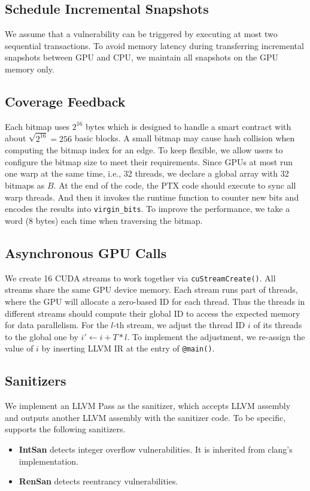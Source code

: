 \subsection{Schedule Incremental Snapshots}
We assume that a vulnerability can be triggered by executing at most two sequential transactions. 
%
To avoid memory latency\cite{bottleneck2015gpu} during transferring incremental snapshots between GPU and CPU, we maintain all snapshots on the GPU memory only. 
%



\subsection{Coverage Feedback}
Each bitmap uses $2^{16}$ bytes which is designed to handle a smart contract with about $\sqrt{2^{16}} = 256$ basic blocks.
A small bitmap may cause hash collision when computing the bitmap index for an edge. 
To keep flexible, we allow users to configure the bitmap size to meet their requirements. 
%
Since GPUs at most run one warp at the same time, i.e., 32 threads, we declare a global array with 32 bitmaps as $B$.
%
At the end of the code, the PTX code should execute  to sync all warp threads.
And then it invokes the runtime function to counter new bits and encodes the results into \texttt{virgin\_bits}. 
To improve the performance, we take a word (8 bytes) each time when traversing the bitmap.


\subsection{Asynchronous GPU Calls}
We create 16 CUDA streams to work together via \texttt{cuStreamCreate()}.
All streams share the same GPU device memory. 
Each stream runs part of threads, where the GPU will allocate a zero-based ID for each thread. 
Thus the threads in different streams should compute their global ID to access the expected memory for data parallelism.
%
For the $l$-th stream, we adjust the thread ID $i$ of its threads to the global one by $i' \gets i + T*l$.
To implement the adjustment, we re-assign the value of $i$ by inserting LLVM IR at the entry of \texttt{@main()}.


\subsection{Sanitizers}
We implement an LLVM Pass as the sanitizer, which accepts LLVM assembly and outputs another LLVM assembly with the sanitizer code.
To be specific, {\tool} supports the following sanitizers. 
\begin{itemize}
    \item \textbf{IntSan} detects integer overflow vulnerabilities. It is inherited from clang's implementation.
    \item \textbf{RenSan} detects reentrancy vulnerabilities. 
\end{itemize}

